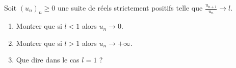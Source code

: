 
Soit $(u_n)_n \ge 0$ une suite de réels strictement positifs telle que $\frac{u_{n+1}}{u_n} \rightarrow l$.

\begin{enumerate}

\item Montrer que si $l<1$ alors $u_n \rightarrow 0$.

\item Montrer que si $l>1$ alors $u_n \rightarrow + \infty$.

\item Que dire dans le cas $l=1$ ?

\end{enumerate}



